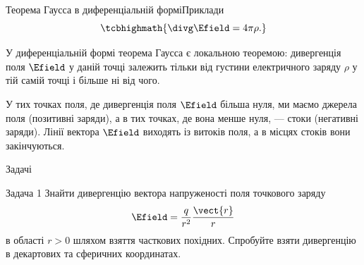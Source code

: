 \documentclass{beamer}
\begin{document}
\begin{frame}{Теорема Гаусса в диференціальній формі}{Приклади}
	\begin{equation*}
		\tcbhighmath{
			\divg\Efield = 4\pi\rho.
		}
	\end{equation*}

	\begin{overprint}
		\begin{block}{}\justifying
			У диференціальній формі теорема Гаусса є \alert{локальною теоремою}:
			дивергенція поля $\Efield$ у даній точці залежить тільки від густини
			електричного заряду $\rho$ у тій самій точці і більше ні від чого.
			\begin{center}
				
			\end{center}
		\end{block}


		\begin{center}
			
		\end{center}
		\begin{block}{}\justifying
			У тих точках поля, де дивергенція поля $\Efield$ \alert{більша нуля}, ми
			маємо \alert{джерела поля} (позитивні заряди), а в тих точках, де вона
			\alert{менше нуля}, --- стоки (негативні заряди). Лінії вектора $\Efield$
			виходять із витоків поля, а в місцях стоків вони закінчуються.
		\end{block}
	\end{overprint}

\end{frame}





\begin{frame}{Задачі}{}
	\begin{exampleblock}{Задача 1}\justifying
		Знайти дивергенцію вектора напруженості поля точкового заряду
		\begin{equation*}
			\Efield = \frac{q}{r^2} \frac{\vect{r}}{r}
		\end{equation*}
		в області $r >0$ шляхом взяття часткових похідних.
		Спробуйте взяти дивергенцію в декартових та сферичних координатах.
	\end{exampleblock}
\end{frame}
\end{document}
